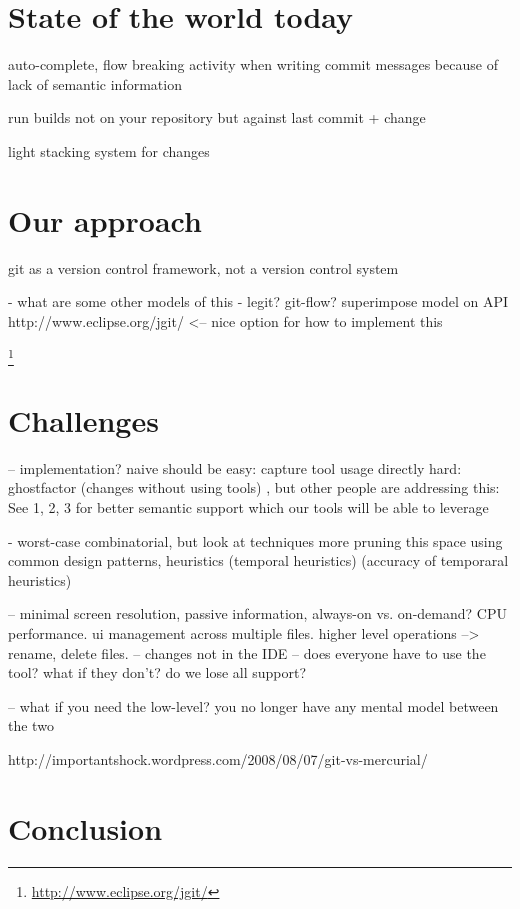 \documentclass[conference]{IEEEtran}
\begin{document}
\section{State of the world today}

auto-complete, flow breaking activity when writing commit messages because of lack of semantic information

run builds not on your repository but against last commit + change

light stacking system for changes

\section{Our approach}

git as a version control framework, not a version control system

- what are some other models of this
- legit? git-flow? superimpose model on API
http://www.eclipse.org/jgit/ <-- nice option for how to implement this

\footnote{\url{http://www.eclipse.org/jgit/}}

\section{Challenges}

-- implementation?
naive should be easy: capture tool usage directly  
hard: ghostfactor (changes without using tools) , but other people
 are addressing this: See 1, 2, 3 for better semantic support which our tools will be able to leverage
 
 - worst-case combinatorial, but look at techniques more pruning this space using common design patterns, heuristics (temporal heuristics) (accuracy of temporaral heuristics)
 
 -- minimal screen resolution, passive information, always-on vs. on-demand? CPU performance. ui management across multiple files. higher level operations --> rename, delete files.
 -- changes not in the IDE
 -- does everyone have to use the tool? what if they don't? do we lose all support?

 -- what if you need the low-level? you no longer have any mental model between the two
 
 http://importantshock.wordpress.com/2008/08/07/git-vs-mercurial/


\section{Conclusion}
\end{document}
